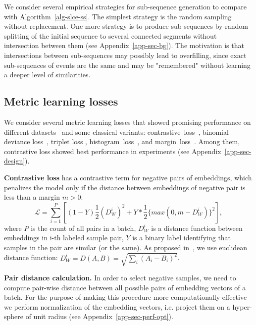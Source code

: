 \documentclass{article}
\begin{document}
We consider several empirical strategies for sub-sequence generation to compare with Algorithm~\ref{alg-slce-ss}. The simplest strategy is the random sampling without replacement.
One more strategy is to produce sub-sequences by random splitting of the initial sequence to several connected segments without intersection between them
(see Appendix~\ref{app-sec-bg}). The motivation is that intersections between sub-sequences may possibly lead to overfilling, since exact sub-sequences of events are the same and may be "remembered" without learning a deeper level of similarities.



\subsection{Metric learning losses} \label{sec-ml-loss}

We consider several metric learning losses that showed promising performance on different datasets~\cite{Kaya2019DeepML} and some classical variants: contrastive~loss~\cite{Hadsell2006DimensionalityRB}, binomial deviance loss~\cite{Yi2014DeepML}, triplet loss \cite{Hoffer2015DeepML}, histogram~loss~\cite{Ustinova2016LearningDE}, and margin~loss~\cite{Manmatha2017SamplingMI}. Among them, contrastive loss showed best performance in experiments (see Appendix~\ref{app-sec-design}).

\textbf{Contrastive loss} has a contrastive term for negative pairs of embeddings, which penalizes the model only if the distance between embeddings of negative pair is less than a margin $m>0$:  
\begin{equation}
 \mathcal{L} = \sum_{i=1}^P \left[ (1-Y)\frac{1}{2}(D_W^i)^2 +Y*\frac{1}{2}\{max(0,m-D_W^i)\}^2 \right],
\end{equation}
where $P$ is the count of all pairs in a batch, $D_W^i$ is a distance function between embeddings in i-th labeled sample pair, $Y$ is a binary label identifying that samples in the pair are similar (or the same).
As proposed in~\cite{Hadsell2006DimensionalityRB}, we use euclidean distance function: $D_W^i = D(A,B) = \sqrt{\sum_i(A_i - B_i)^2}$.

\textbf{Pair distance calculation.} In order to select negative samples, we need to compute pair-wise distance between all possible pairs of embedding vectors of a batch. For the purpose of making this procedure more computationally effective we perform normalization of the embedding vectors, i.e. project them on a hyper-sphere of unit radius (see Appendix~\ref{app-sec-perf-opt}).
\end{document}
